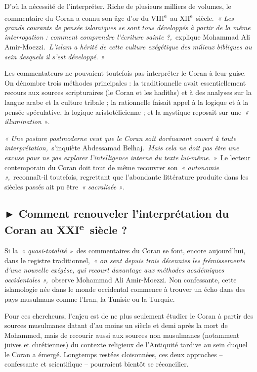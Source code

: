  
D'où la nécessité de l'interpréter. Riche de plusieurs milliers de
volumes, le commentaire du Coran a connu son âge d'or du
VIII\textsuperscript{e}~au XII\textsuperscript{e}~siècle.\emph{~« Les
grands courants de pensée islamiques se sont tous développés à partir de
la même interrogation : comment comprendre l'écriture sainte
?,~}explique Mohammad Ali Amir-Moezzi.\emph{~­L'islam a hérité de cette
culture exégétique des milieux bibliques au sein desquels il s'est
développé. »}

Les commentateurs ne pouvaient toutefois pas interpréter le Coran à leur
guise. On dénombre trois méthodes principales : la traditionnelle avait
essentiellement recours aux sources scripturaires (le Coran et les
hadiths) et à des analyses sur la langue arabe et la culture tribale ;
la rationnelle faisait appel à la logique et à la pensée spéculative, la
logique aristotélicienne ; et la mystique reposait sur une~\emph{«
illumination »}.

 

\emph{« Une posture postmoderne veut que le Coran soit dorénavant ouvert
à toute interprétation,~}s'inquiète Abdessamad Belhaj.\emph{~Mais cela
ne doit pas être une excuse pour ne pas explorer l'intelligence interne
du texte lui-même. »}~Le lecteur contemporain du Coran doit tout de même
recouvrer son~\emph{« autonomie »,}~reconnaît-il toutefois, regrettant
que l'abondante littérature produite dans les siècles passés ait pu
être~\emph{« sacralisée »}.

\subsection{► Comment renouveler l'interprétation du Coran au
XXI\textsuperscript{e}~siècle ?}

Si la~\emph{« quasi-totalité »}~des commentaires du Coran se font,
encore aujourd'hui, dans le registre traditionnel,~\emph{« on sent
depuis trois décennies les frémissements d'une nouvelle exégèse, qui
recourt davantage aux méthodes académiques occidentales »,~}observe
Mohammad Ali Amir-Moezzi. Non confessante, cette islamologie née dans le
monde occidental commence à trouver un écho dans des pays musulmans
comme l'Iran, la Tunisie ou la Turquie.

 

Pour ces chercheurs, l'enjeu est de ne plus seulement étudier le Coran à
partir des sources musulmanes datant d'au moins un siècle et demi après
la mort de Mohammed, mais de recourir aussi aux sources non musulmanes
(notamment juives et chrétiennes) du contexte religieux de l'Antiquité
tardive au sein duquel le Coran a émergé. Longtemps restées cloisonnées,
ces deux approches -- confessante et scientifique -- pourraient bientôt
se réconcilier.

